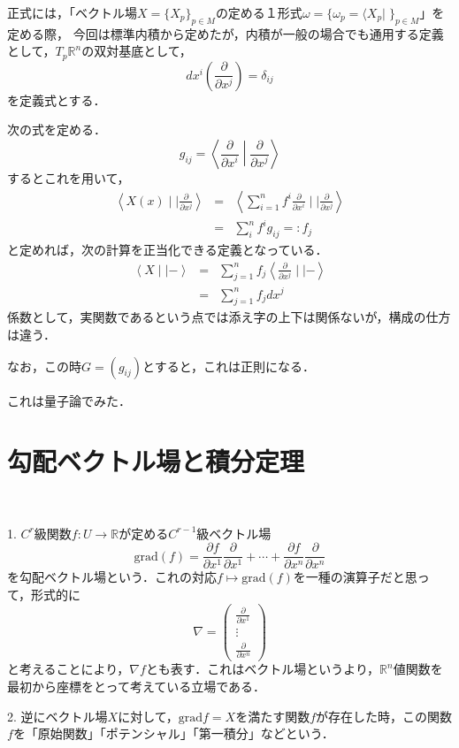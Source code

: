 \documentclass[uplatex, dvipdfmx]{jsreport}
\begin{document}
\begin{remark}
    正式には，「ベクトル場$X=\{X_p\}_{p\in M}$の定める１形式$\omega=\{\omega_p=\langle X_p|\;\}_{p\in M}$」を定める際，
    今回は標準内積から定めたが，内積が一般の場合でも通用する定義として，$T_p\mathbb{R}^n$の双対基底として，
    \[dx^i\left( \frac{\partial}{\partial x^j}\right)=\delta_{ij}\]
    を定義式とする．

    次の式を定める．
    \[ g_{ij}=\left\langle \frac{\partial}{\partial x^i}\middle| \frac{\partial}{\partial x^j}\right\rangle \]
    するとこれを用いて，
    \begin{eqnarray*}
        \left\langle X(x)\mid| \frac{\partial}{\partial x^j}\right\rangle &=& \left\langle \sum^n_{i=1}f^i\frac{\partial}{\partial x^i}\mid| \frac{\partial}{\partial x^j}\right\rangle \\
        &=& \sum^n_if^ig_{ij} =: f_j
    \end{eqnarray*}
    と定めれば，次の計算を正当化できる定義となっている．
    \begin{eqnarray*}
        \left\langle X\mid| -\right\rangle &=& \sum^n_{j=1}f_j\left\langle \frac{\partial}{\partial x^j}\mid| -\right\rangle \\
        &=& \sum^n_{j=1}f_jdx^j
    \end{eqnarray*}
    係数として，実関数であるという点では添え字の上下は関係ないが，構成の仕方は違う．

    なお，この時$G=(g_{ij})$とすると，これは正則になる．

    これは量子論でみた．
\end{remark}

\section{勾配ベクトル場と積分定理}

\begin{definition}[勾配ベクトル場]　

    1. $C^r$級関数$f:U\to\mathbb{R}$が定める$C^{r-1}$級ベクトル場
    \[ \mathrm{grad}(f)=\frac{\partial f}{\partial x^1}\frac{\partial}{\partial x^1}+\cdots +\frac{\partial f}{\partial x^n}\frac{\partial}{\partial x^n} \]
    を勾配ベクトル場という．これの対応$f\mapsto\mathrm{grad}(f)$を一種の演算子だと思って，形式的に
    \[\nabla=\left(\begin{array}{c}\frac{\partial}{\partial x^1} \\ \vdots \\ \frac{\partial}{\partial x^n}\end{array}\right)\]
    と考えることにより，$\nabla f$とも表す．これはベクトル場というより，$\mathbb{R}^n$値関数を最初から座標をとって考えている立場である．

    2. 逆にベクトル場$X$に対して，$\mathrm{grad}f=X$を満たす関数$f$が存在した時，この関数$f$を「原始関数」「ポテンシャル」「第一積分」などという．
\end{definition}
\end{document}
